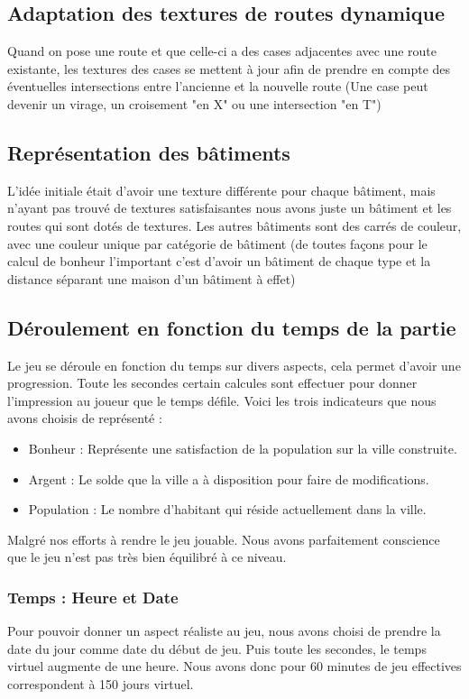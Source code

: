 \documentclass[a4paper,10pt,openany,oneside]{report}
\begin{document}
\subsection{Adaptation des textures de routes dynamique}
Quand on pose une route et que celle-ci a des cases adjacentes avec une route existante, les textures des cases se mettent à jour afin de prendre en compte des éventuelles intersections entre l'ancienne et la nouvelle route (Une case peut devenir un virage, un croisement "en X" ou une intersection "en T")
\subsection{Représentation des bâtiments}
L'idée initiale était d'avoir une texture différente pour chaque bâtiment, mais n'ayant pas trouvé de textures satisfaisantes nous avons juste un bâtiment et les routes qui sont dotés de textures.
\newline
Les autres bâtiments sont des carrés de couleur, avec une couleur unique par catégorie de bâtiment (de toutes façons pour le calcul de bonheur l'important c'est d'avoir un bâtiment de chaque type et la distance séparant une maison d'un bâtiment à effet)
\subsection{Déroulement en fonction du temps de la partie}
Le jeu se déroule en fonction du temps sur divers aspects, cela permet d'avoir une progression. Toute les secondes certain calcules sont effectuer pour donner l'impression au joueur que le temps défile. Voici les trois indicateurs que nous avons choisis de représenté :
\begin{itemize}
	\item Bonheur : Représente une satisfaction de la population sur la ville construite.
	\item Argent : Le solde que la ville a à disposition pour faire de modifications.
	\item Population : Le nombre d'habitant qui réside actuellement dans la ville.
\end{itemize}
Malgré nos efforts à rendre le jeu jouable. Nous avons parfaitement conscience que le jeu n'est pas très bien équilibré à ce niveau.
\subsubsection{Temps : Heure et Date}
Pour pouvoir donner un aspect réaliste au jeu, nous avons choisi de prendre la date du jour comme date du début de jeu. Puis toute les secondes, le temps virtuel augmente de une heure. Nous avons donc pour 60 minutes de jeu effectives correspondent à 150 jours virtuel.
\end{document}
